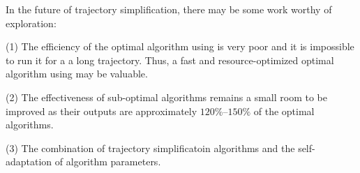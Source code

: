In the future of trajectory simplification, there may be some work worthy of exploration:

(1) The efficiency of the optimal algorithm using \sed is very poor and it is impossible to run it for a a long trajectory. Thus, a fast and resource-optimized optimal algorithm using \sed may be valuable.

(2) The effectiveness of sub-optimal algorithms remains a small room to be improved as their outputs are approximately $120\%$--$150\%$ of the optimal algorithms.

(3) The combination of trajectory simplificatoin algorithms and the self-adaptation of algorithm parameters.

